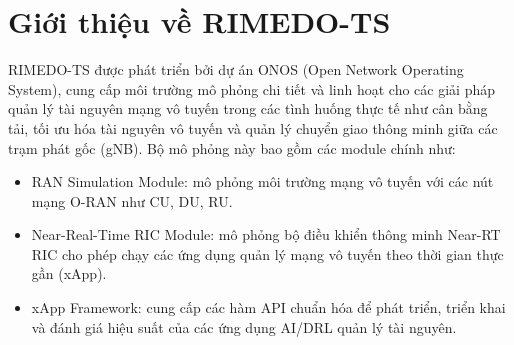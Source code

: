\section{Giới thiệu về RIMEDO-TS}
RIMEDO-TS được phát triển bởi dự án ONOS (Open Network Operating System), cung cấp môi trường mô phỏng chi tiết và linh hoạt cho các giải pháp quản lý tài nguyên mạng vô tuyến trong các tình huống thực tế như cân bằng tải, tối ưu hóa tài nguyên vô tuyến và quản lý chuyển giao thông minh giữa các trạm phát gốc (gNB). Bộ mô phỏng này bao gồm các module chính như:
\begin{itemize}
    \item RAN Simulation Module: mô phỏng môi trường mạng vô tuyến với các nút mạng O-RAN như CU, DU, RU.
    \item Near-Real-Time RIC Module: mô phỏng bộ điều khiển thông minh Near-RT RIC cho phép chạy các ứng dụng quản lý mạng vô tuyến theo thời gian thực gần (xApp).
    \item xApp Framework: cung cấp các hàm API chuẩn hóa để phát triển, triển khai và đánh giá hiệu suất của các ứng dụng AI/DRL quản lý tài nguyên.
\end{itemize}